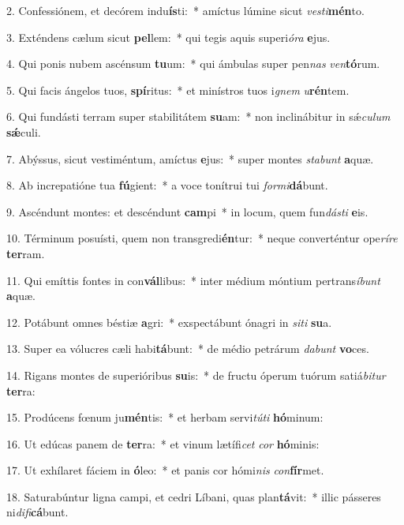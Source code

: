 2. Confessiónem, et decórem indu\textbf{ís}ti:~*  amíctus lúmine sicut \textit{ves}\textit{ti}\textbf{mén}to.\

3. Exténdens cælum sicut \textbf{pel}lem:~*  qui tegis aquis superi\textit{ó}\textit{ra} \textbf{e}jus.\

4. Qui ponis nubem ascénsum \textbf{tu}um:~*  qui ámbulas super pen\textit{nas} \textit{ven}\textbf{tó}rum.\

5. Qui facis ángelos tuos, \textbf{spí}ritus:~*  et minístros tuos i\textit{gnem} \textit{u}\textbf{rén}tem.\

6. Qui fundásti terram super stabilitátem \textbf{su}am:~*  non inclinábitur in sǽ\textit{cu}\textit{lum} \textbf{sǽ}culi.\

7. Abýssus, sicut vestiméntum, amíctus \textbf{e}jus:~*  super montes \textit{sta}\textit{bunt} \textbf{a}quæ.\

8. Ab increpatióne tua \textbf{fú}gient:~*  a voce tonítrui tui \textit{for}\textit{mi}\textbf{dá}bunt.\

9. Ascéndunt montes: et descéndunt \textbf{cam}pi~*  in locum, quem fun\textit{dás}\textit{ti} \textbf{e}is.\

10. Términum posuísti, quem non transgredi\textbf{én}tur:~*  neque converténtur ope\textit{rí}\textit{re} \textbf{ter}ram.\

11. Qui emíttis fontes in con\textbf{vál}libus:~*  inter médium móntium pertrans\textit{í}\textit{bunt} \textbf{a}quæ.\

12. Potábunt omnes béstiæ \textbf{a}gri:~*  exspectábunt ónagri in \textit{si}\textit{ti} \textbf{su}a.\

13. Super ea vólucres cæli habi\textbf{tá}bunt:~*  de médio petrárum \textit{da}\textit{bunt} \textbf{vo}ces.\

14. Rigans montes de superióribus \textbf{su}is:~*  de fructu óperum tuórum satiá\textit{bi}\textit{tur} \textbf{ter}ra:\

15. Prodúcens fœnum ju\textbf{mén}tis:~*  et herbam servi\textit{tú}\textit{ti} \textbf{hó}minum:\

16. Ut edúcas panem de \textbf{ter}ra:~*  et vinum lætífi\textit{cet} \textit{cor} \textbf{hó}minis:\

17. Ut exhílaret fáciem in \textbf{ó}leo:~*  et panis cor hómi\textit{nis} \textit{con}\textbf{fír}met.\

18. Saturabúntur ligna campi, et cedri Líbani, quas plan\textbf{tá}vit:~*  illic pásseres ni\textit{di}\textit{fi}\textbf{cá}bunt.\

